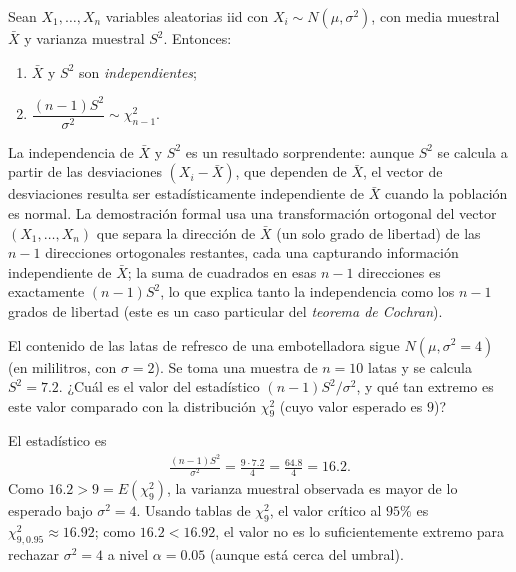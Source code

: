 \begin{teorema}
 \label{eq:5.3.2}
Sean $X_1, \ldots, X_n$ variables aleatorias iid con $X_i \sim N(\mu, \sigma^2)$, con
media muestral $\bar{X}$ y varianza muestral $S^2$. Entonces:
\begin{enumerate}
 \item $\bar{X}$ y $S^2$ son \emph{independientes};
 \item $\dfrac{(n-1)S^2}{\sigma^2} \sim \chi^2_{n-1}$.
\end{enumerate}
\end{teorema}

\begin{observacion}
La independencia de $\bar{X}$ y $S^2$ es un resultado sorprendente: aunque $S^2$ se
calcula a partir de las desviaciones $(X_i-\bar{X})$, que dependen de $\bar{X}$, el
vector de desviaciones resulta ser estad\'isticamente independiente de $\bar{X}$
cuando la poblaci\'on es normal. La demostraci\'on formal usa una transformaci\'on
ortogonal del vector $(X_1,\ldots,X_n)$ que separa la direcci\'on de $\bar{X}$
(un solo grado de libertad) de las $n-1$ direcciones ortogonales restantes, cada una
capturando informaci\'on independiente de $\bar X$; la suma de cuadrados en esas
$n-1$ direcciones es exactamente $(n-1)S^2$, lo que explica tanto la independencia
como los $n-1$ grados de libertad (este es un caso particular del \emph{teorema de
Cochran}).
\end{observacion}

\begin{ejemplo}
 \label{exmp:5.3.1}
El contenido de las latas de refresco de una embotelladora sigue
$N(\mu, \sigma^2=4)$ (en mililitros, con $\sigma=2$). Se toma una muestra de $n=10$
latas y se calcula $S^2 = 7.2$. ¿Cu\'al es el valor del estad\'istico
$(n-1)S^2/\sigma^2$, y qu\'e tan extremo es este valor comparado con la distribuci\'on
$\chi^2_9$ (cuyo valor esperado es $9$)?
\end{ejemplo}

\begin{solucion}
El estad\'istico es
\begin{align}
 \frac{(n-1)S^2}{\sigma^2} = \frac{9 \cdot 7.2}{4} = \frac{64.8}{4} = 16.2.
\end{align}
Como $16.2 > 9 = E(\chi^2_9)$, la varianza muestral observada es mayor de lo
esperado bajo $\sigma^2=4$. Usando tablas de $\chi^2_9$, el valor cr\'itico al
$95\%$ es $\chi^2_{9,0.95} \approx 16.92$; como $16.2 < 16.92$, el valor no es lo
suficientemente extremo para rechazar $\sigma^2=4$ a nivel $\alpha=0.05$ (aunque
est\'a cerca del umbral).
\end{solucion}


